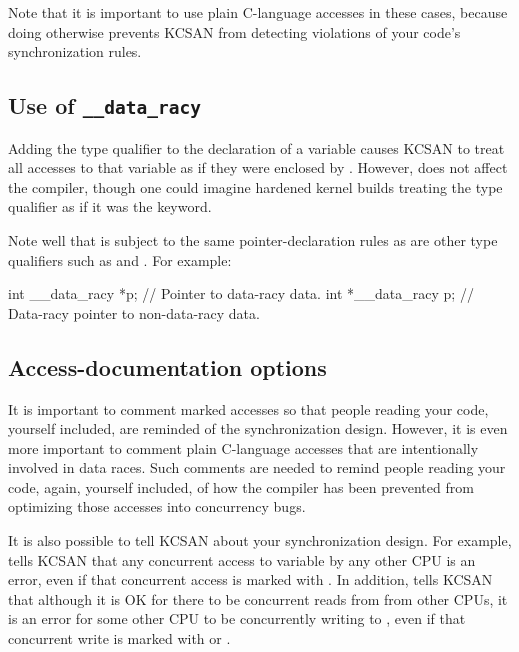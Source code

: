 Note that it is important to use plain C-language accesses in these cases,
because doing otherwise prevents KCSAN from detecting violations of your
code's synchronization rules.


\subsection{Use of \texttt{\_\_data\_racy}}

Adding the  type qualifier to the declaration of a variable
causes KCSAN to treat all accesses to that variable as if they were
enclosed by .
However,  does not affect the compiler, though one could
imagine hardened kernel builds treating the  type qualifier
as if it was the  keyword.

Note well that  is subject to the same pointer-declaration
rules as are other type qualifiers such as  and .
For example:

\begin{VerbatimU}
	int __data_racy *p; // Pointer to data-racy data.
	int *__data_racy p; // Data-racy pointer to non-data-racy data.
\end{VerbatimU}

\subsection{Access-documentation options}
\label{sec:docs:access-marking:Access-documentation options}

It is important to comment marked accesses so that people reading your
code, yourself included, are reminded of the synchronization design.
However, it is even more important to comment plain C-language accesses
that are intentionally involved in data races.
Such comments are needed to remind people reading your code, again,
yourself included, of how the compiler has been prevented from optimizing
those accesses into concurrency bugs.

It is also possible to tell KCSAN about your synchronization design.
For example,  tells KCSAN that any
concurrent access to variable  by any other CPU is an error, even
if that concurrent access is marked with .
In addition,  tells KCSAN that although
it is OK for there to be concurrent reads from  from other CPUs,
it is an error for some other CPU to be concurrently writing to ,
even if that concurrent write is marked with  or
.

